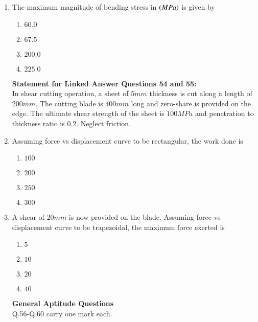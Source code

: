 \documentclass[journal]{IEEEtran}
\begin{document}
\begin{enumerate}
    \item The maximum magnitude of bending stress in $\left(MPa\right)$ is given by 
    \begin{enumerate}
    \item $60.0$
    \item $67.5$
    \item $200.0$
    \item $225.0$
    \end{enumerate}
    \textbf{Statement for Linked Answer Questions 54 and 55:}\\

In shear cutting operation, a sheet of $5mm$ thickness is cut along a length of $200mm$. The cutting blade is $400 mm$ long  and zero-share  is provided on the edge. The ultimate shear strength of the sheet is $100 MPa$ and penetration to thickness ratio is $0.2$. Neglect friction.\\
    \item Assuming force vs displacement curve to be rectangular, the work done  is
    \begin{enumerate}
        \item $100$
        \item $200$
        \item $250$
        \item $300$
    \end{enumerate}
    \item A shear of $20 mm$  is now provided on the blade. Assuming force vs displacement curve to be trapezoidal, the maximum force  exerted is
    \begin{enumerate}
        \item $5$
        \item $10$
        \item $20$
        \item $40$
    \end{enumerate}
    \textbf{General Aptitude  Questions}\\
    Q.56-Q.60 carry one mark each.\\


\end{enumerate}
\end{document}
